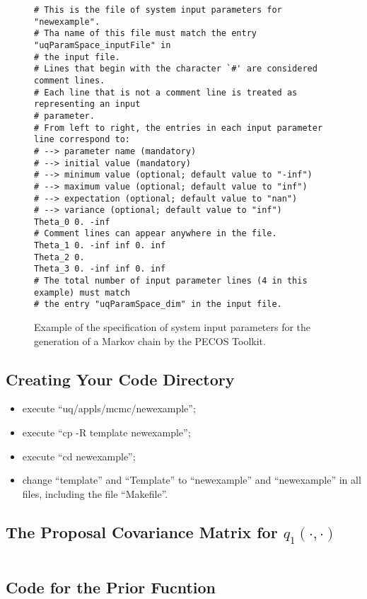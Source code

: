 \begin{figure}[h!]
\begin{verbatim}
# This is the file of system input parameters for "newexample".
# Tha name of this file must match the entry "uqParamSpace_inputFile" in
# the input file.
# Lines that begin with the character `#' are considered comment lines.
# Each line that is not a comment line is treated as representing an input
# parameter.
# From left to right, the entries in each input parameter line correspond to:
# --> parameter name (mandatory)
# --> initial value (mandatory)
# --> minimum value (optional; default value to "-inf")
# --> maximum value (optional; default value to "inf")
# --> expectation (optional; default value to "nan")
# --> variance (optional; default value to "inf")
Theta_0 0. -inf
# Comment lines can appear anywhere in the file.
Theta_1 0. -inf inf 0. inf
Theta_2 0.
Theta_3 0. -inf inf 0. inf
# The total number of input parameter lines (4 in this example) must match
# the entry "uqParamSpace_dim" in the input file.
\end{verbatim}
\caption{Example of the specification of system input parameters for the generation of a Markov chain by the PECOS Toolkit.
}
\label{fig-dram-par-file-ex}
\end{figure}

\subsection{Creating Your Code Directory}\label{subsc-gmc-seven-steps-myexample}

\begin{itemize}
\item execute ``uq/appls/mcmc/newexample'';
\item execute ``cp -R template newexample'';
\item execute ``cd newexample'';
\item change ``template'' and ``Template'' to ``newexample'' and ``newexample'' in all files, including the file ``Makefile''.
\end{itemize}

\subsection{The Proposal Covariance Matrix for $q_1(\cdot,\cdot)$}\label{subsc-gmc-seven-steps-proposal-cov-matrix-for-q1}
$~$\\

\subsection{Code for the Prior Fucntion}\label{subsc-gmc-seven-steps-prior-code}


